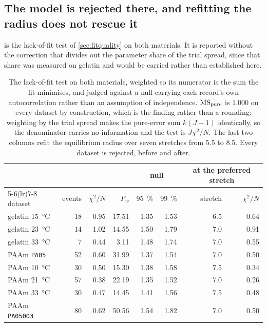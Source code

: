 \documentclass[10pt]{article}
\begin{document}
\subsection*{The model is rejected there, and refitting the radius does not rescue it}

 is the lack-of-fit test of \cref{sec:fitquality} on both materials. It is
reported without the correction that divides out the parameter share of the trial spread, since
that share was measured on gelatin and would be carried rather than established here.

\begin{table}[htbp]
\centering
\caption{The lack-of-fit test on both materials, weighted so its numerator is the sum the fit
minimises, and judged against a null carrying each record's own autocorrelation rather than an
assumption of independence. $\mathrm{MS}_{\rm pure}$ is $1.000$ on every dataset by
construction, which is the finding rather than a rounding: weighting by the trial spread makes
the pure-error sum $k(J-1)$ identically, so the denominator carries no information and the test
is $J\chi^2/N$. The last two columns refit the equilibrium radius over seven stretches from
$5.5$ to $8.5$. Every dataset is rejected, before and after.}
\label{tab:paam}
\begin{tabular}{lrrrrrrr}
\toprule
& & & & \multicolumn{2}{c}{null} & \multicolumn{2}{c}{at the preferred stretch} \\
\cmidrule(lr){5-6}\cmidrule(lr){7-8}
dataset & events & $\chi^2/N$ & $F_w$ & \SI{95}{\percent} & \SI{99}{\percent} & stretch & $\chi^2/N$ \\
\midrule
gelatin \SI{15}{\celsius} & 18 & 0.95 & 17.51 & 1.35 & 1.53 & 6.5 & 0.64 \\
gelatin \SI{23}{\celsius} & 14 & 1.02 & 14.55 & 1.50 & 1.79 & 7.0 & 0.91 \\
gelatin \SI{33}{\celsius} & 7 & 0.44 & 3.11 & 1.48 & 1.74 & 7.0 & 0.55 \\
\midrule
PAAm \texttt{PA05} & 52 & 0.60 & 31.99 & 1.37 & 1.54 & 7.0 & 0.50 \\
PAAm \SI{10}{\celsius} & 30 & 0.50 & 15.30 & 1.38 & 1.58 & 7.5 & 0.34 \\
PAAm \SI{21}{\celsius} & 57 & 0.38 & 22.19 & 1.35 & 1.52 & 7.0 & 0.26 \\
PAAm \SI{33}{\celsius} & 30 & 0.47 & 14.45 & 1.41 & 1.56 & 7.5 & 0.48 \\
PAAm \texttt{PA05003} & 80 & 0.62 & 50.56 & 1.54 & 1.82 & 7.0 & 0.50 \\
\bottomrule
\end{tabular}
\end{table}
\end{document}
